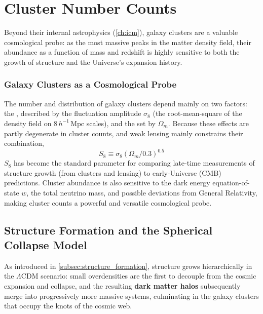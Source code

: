 \newpage

\section{Cluster Number Counts} \label{sec:cluster_number_counts}

Beyond their internal astrophysics (\cref{ch:icm}), galaxy clusters are a valuable cosmological probe: as the most massive peaks in the matter density field, their abundance as a function of mass and redshift is highly sensitive to both the growth of structure and the Universe's expansion history.

\subsubsection{Galaxy Clusters as a Cosmological Probe} \label{subsubsec:clusters_cosmo_probe}

The number and distribution of galaxy clusters depend mainly on two factors: the , described by the fluctuation amplitude $\sigma_8$ (the root-mean-square of the density field on $8\,h^{-1}\,\text{Mpc}$ scales), and the  set by $\Omega_m$. Because these effects are partly degenerate in cluster counts, and weak lensing mainly constrains their combination,
\smallskip
$$
S_8 \equiv \sigma_8 \left(\Omega_m / 0.3\right)^{0.5}
$$
$S_8$ has become the standard parameter for comparing late-time measurements of structure growth (from clusters and lensing) to early-Universe (CMB) predictions. Cluster abundance is also sensitive to the dark energy equation-of-state $w$, the total neutrino mass, and possible deviations from General Relativity, making cluster counts a powerful and versatile cosmological probe.


\subsection{Structure Formation and the Spherical Collapse Model} \label{subsec:spherical_collapse}

As introduced in \cref{subsec:structure_formation}, structure grows hierarchically in the $\Lambda$CDM scenario: small overdensities are the first to decouple from the cosmic expansion and collapse, and the resulting \textbf{dark matter halos} subsequently merge into progressively more massive systems, culminating in the galaxy clusters that occupy the knots of the cosmic web.

\smallskip

